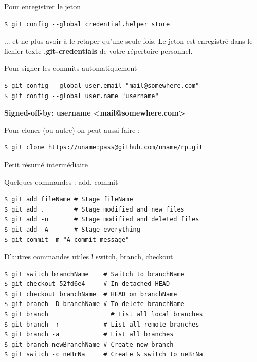 \documentclass[a4paper,11pt]{beamer}
\begin{document}
\begin{frame}[containsverbatim]

\begin{alertblock}{Pour enregistrer le jeton}
\begin{lstlisting}
$ git config --global credential.helper store
\end{lstlisting}
\justifying ... et ne plus avoir à le retaper qu'une seule fois. Le jeton est enregistré dans le fichier texte \textbf{.git-credentials} de votre répertoire personnel.
\end{alertblock}

\begin{alertblock}{Pour signer les commits automatiquement}
\begin{lstlisting}
$ git config --global user.email "mail@somewhere.com"
$ git config --global user.name "username"
\end{lstlisting}
\centering\textbf{Signed-off-by: username \textless mail@somewhere.com\textgreater}
\end{alertblock}

\begin{alertblock}{Pour cloner (ou autre) on peut aussi faire :}
\begin{lstlisting}
$ git clone https://uname:pass@github.com/uname/rp.git
\end{lstlisting}
\end{alertblock}

\end{frame}

\begin{frame}[containsverbatim]{Petit résumé intermédiaire}
\begin{alertblock}{Quelques commandes : add, commit}
\justifying
    \begin{lstlisting}
$ git add fileName # Stage fileName
$ git add .        # Stage modified and new files
$ git add -u       # Stage modified and deleted files
$ git add -A       # Stage everything
$ git commit -m "A commit message"
    \end{lstlisting}
\end{alertblock}
\end{frame}

\begin{frame}[containsverbatim]
\begin{alertblock}{D'autres commandes utiles ! switch, branch, checkout}
\justifying
    \begin{lstlisting}
$ git switch branchName    # Switch to branchName
$ git checkout 52fd6e4     # In detached HEAD
$ git checkout branchName  # HEAD on branchName
$ git branch -D branchName # To delete branchName
$ git branch	             # List all local branches
$ git branch -r	           # List all remote branches
$ git branch -a	           # List all branches
$ git branch newBranchName # Create new branch
$ git switch -c neBrNa     # Create & switch to neBrNa
    \end{lstlisting}
\end{alertblock}
\end{frame}
\end{document}
